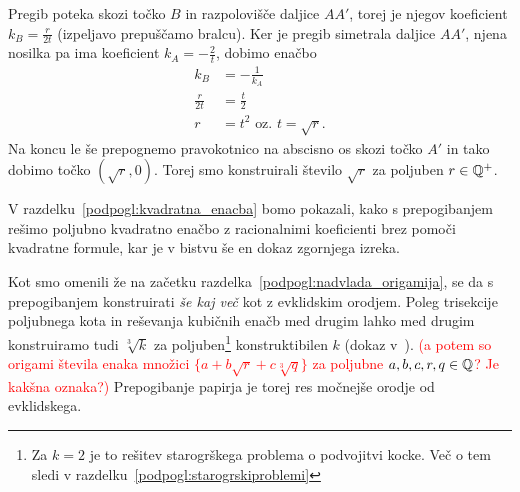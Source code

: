 \begin{dokaz}
    Pregib poteka skozi točko $B$ in razpolovišče daljice $AA'$, torej je njegov koeficient $k_B = \frac{r}{2t}$ (izpeljavo prepuščamo bralcu). Ker je pregib simetrala daljice $AA'$, njena nosilka pa ima koeficient $k_A = - \frac{2}{t}$, dobimo enačbo
    \begin{align*}
        k_B &= - \frac{1}{k_A}\\
        \frac{r}{2t} &= \frac{t}{2}\\
        r &= t^2 \text{ oz. } t = \sqrt{r}.
    \end{align*}
    Na koncu le še prepognemo pravokotnico na abscisno os skozi točko $A'$ in tako dobimo točko $(\sqrt{r}, 0)$. Torej smo konstruirali število $\sqrt{r}$ za poljuben $r \in \mathbb Q^{+}$.
\end{dokaz}

\begin{opomba}
    V razdelku~\ref{podpogl:kvadratna_enacba} bomo pokazali, kako s prepogibanjem rešimo poljubno kvadratno enačbo z racionalnimi koeficienti brez pomoči kvadratne formule, kar je v bistvu še en dokaz zgornjega izreka.
\end{opomba}

Kot smo omenili že na začetku razdelka~\ref{podpogl:nadvlada_origamija}, se da s prepogibanjem konstruirati \emph{še kaj več} kot z evklidskim orodjem. Poleg trisekcije poljubnega kota in reševanja kubičnih enačb med drugim lahko med drugim konstruiramo tudi $\sqrt[3]{k} $ za poljuben\footnote{Za $k = 2$ je to rešitev starogrškega problema o podvojitvi kocke. Več o tem sledi v razdelku~\ref{podpogl:starogrskiproblemi}} konstruktibilen $k$ (dokaz v~\cite[str.\ 156]{geometricconstructions}). \textcolor{red}{(a potem so origami števila enaka množici $\{ a + b \sqrt{r} + c \sqrt[3]{q} \}$ za poljubne $a, b, c, r, q \in \mathbb Q$? Je kakšna oznaka?)} Prepogibanje papirja je torej res močnejše orodje od evklidskega.